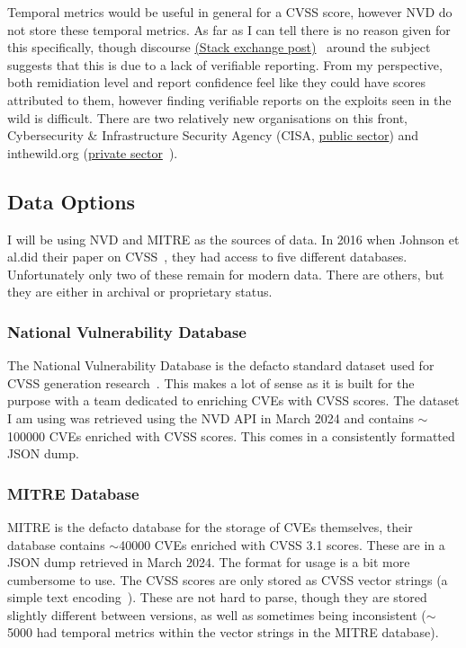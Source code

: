 \documentclass[12pt]{article}
\begin{document}
Temporal metrics would be useful in general for a CVSS score, however NVD do not store these
temporal metrics. As far as I can tell there is no reason given for this specifically, though
discourse
\href{https://security.stackexchange.com/questions/270257/cvss-v3-and-v3-1-missing-temporal-metrics-exploit-code-maturity-and-remediation
}{(Stack exchange post)}~\cite{stack_exchange} around the subject suggests that this is due to a lack
of verifiable reporting. From my perspective, both remidiation level and report confidence feel like
they could have scores attributed to them, however finding verifiable reports on the exploits seen
in the wild is difficult. There are two relatively new organisations on this front,
Cybersecurity \& Infrastructure Security Agency (CISA,
\href{https://www.cisa.gov/known-exploited-vulnerabilities-catalog}{public sector}) and
inthewild.org (\href{https://inthewild.io/}{private sector}~\cite{cisa}).

\subsection{Data Options}

I will be using NVD and MITRE as the sources of data. In 2016 when Johnson et al.\@ did their paper
on CVSS~\cite{bayes}, they had access to five different databases. Unfortunately only two of these
remain for modern data. There are others, but they are either in archival or proprietary status.

\subsubsection{National Vulnerability Database} \label{NVD_SECTION}

The National Vulnerability Database is the defacto standard dataset used for CVSS generation
research~\cite{costa, nvd_example1, nvd_example2}.  This makes a lot of sense as it is built
for the purpose with a team dedicated to enriching CVEs with CVSS scores. The dataset I am using was
retrieved using the NVD API in March 2024 and contains $\sim$100000 CVEs enriched with CVSS scores. This
comes in a consistently formatted JSON dump.

\subsubsection{MITRE Database}  \label{MITRE_SECTION}

MITRE is the defacto database for the storage of CVEs themselves, their database contains $\sim$40000
CVEs enriched with CVSS 3.1 scores. These are in a JSON dump retrieved in March 2024. The
format for usage is a bit more cumbersome to use. The CVSS scores are only stored as CVSS vector
strings (a simple text encoding~\cite{vector_string}). These are not hard to parse, though they are stored slightly
different between versions, as well as sometimes being inconsistent ($\sim$5000 had temporal metrics within
the vector strings in the MITRE database).
\end{document}
